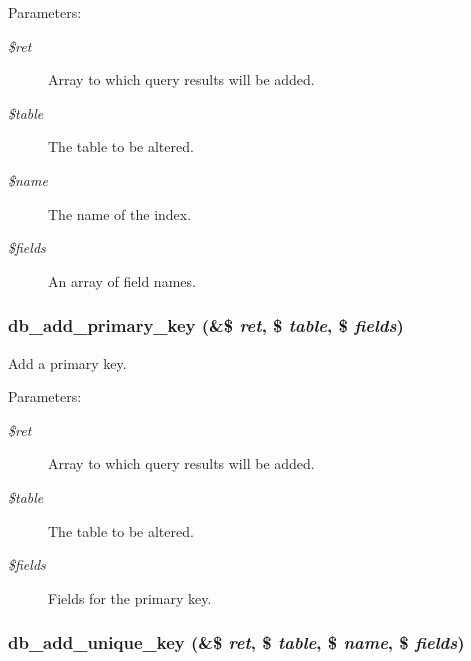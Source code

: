 \begin{Desc}
\item[Parameters:]
\begin{description}
\item[{\em \$ret}]Array to which query results will be added. \item[{\em \$table}]The table to be altered. \item[{\em \$name}]The name of the index. \item[{\em \$fields}]An array of field names. \end{description}
\end{Desc}
\hypertarget{group__schemaapi_g95e6db824dbcdd4f9f486e657137d482}{
\subsubsection[{db\_\-add\_\-primary\_\-key}]{\setlength{\rightskip}{0pt plus 5cm}db\_\-add\_\-primary\_\-key (\&\$ {\em ret}, \/  \$ {\em table}, \/  \$ {\em fields})}}
\label{group__schemaapi_g95e6db824dbcdd4f9f486e657137d482}


Add a primary key.

\begin{Desc}
\item[Parameters:]
\begin{description}
\item[{\em \$ret}]Array to which query results will be added. \item[{\em \$table}]The table to be altered. \item[{\em \$fields}]Fields for the primary key. \end{description}
\end{Desc}
\hypertarget{group__schemaapi_g407af986b5e78e1ef11242d5be8adfc4}{
\subsubsection[{db\_\-add\_\-unique\_\-key}]{\setlength{\rightskip}{0pt plus 5cm}db\_\-add\_\-unique\_\-key (\&\$ {\em ret}, \/  \$ {\em table}, \/  \$ {\em name}, \/  \$ {\em fields})}}
\label{group__schemaapi_g407af986b5e78e1ef11242d5be8adfc4}


